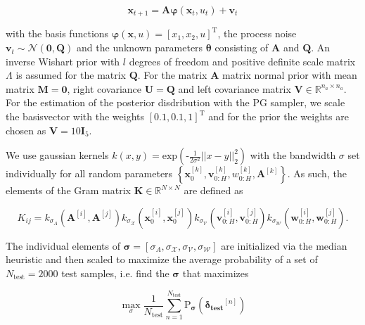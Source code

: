 \begin{equation} \label{State transition}
\boldsymbol{x}_{t+1} = \boldsymbol{A} \boldsymbol{\varphi}(\boldsymbol{x}_t, u_t) + \boldsymbol{v}_{t}
\end{equation}

with the basis functions $\boldsymbol{\varphi} (\boldsymbol{x}, u) = \left[ x_1,  x_2,  u \right]^\text{T}$, the process noise $\boldsymbol{v}_{t} \sim \mathcal{N} (\boldsymbol{0}, \boldsymbol{Q})$ and the unknown parameters $\boldsymbol{\theta}$ consisting of $\boldsymbol{A}$ and $\boldsymbol{Q}$. An inverse Wishart  prior with $l$ degrees of freedom and positive definite scale matrix $\Lambda$ is assumed for the matrix $\boldsymbol{Q}$. For the matrix $\boldsymbol{A}$ matrix normal prior with mean matrix $\boldsymbol{M} = \boldsymbol{0}$, right covariance $\boldsymbol{U} = \boldsymbol{Q}$ and left covariance matrix $\boldsymbol{V} \in \mathbb{R}^{n_a \times n_a}.$ For the estimation of the posterior disdribution with the PG sampler, we scale the basisvector with the weights $\left[ 0.1,  0.1,  1 \right]^\text{T}$ and for the prior the weights are chosen as $\boldsymbol{V} = 10 \boldsymbol{I}_5$.

We use gaussian kernels $k(x,y) = \text{exp}\left(\text{-}\frac{1}{2\sigma^2} ||x - y||_2^2 \right)$ with the bandwidth $\sigma$ set individually for all random parameters $\left\{\boldsymbol{x}_0^{[k]}, \boldsymbol{v}_{0:H}^{[k]}, w_{0:H}^{[k]},  \boldsymbol{A}^{[k]}\right\}$. As such, the elements of the Gram matrix $\boldsymbol{K} \in \mathbb{R}^{N \times N }$ are defined as

\begin{equation} \label{Kernel equation}
K_{ij} = k_{\sigma_A}(\boldsymbol{A}^{[i]}, \boldsymbol{A}^{[j]})  k_{\sigma_\mathcal{X}}(\boldsymbol{x}_0^{[i]}, \boldsymbol{x}_0^{[j]})    k_{\sigma_\mathcal{V}}(\boldsymbol{v}_{0:H}^{[i]}, \boldsymbol{v}_{0:H}^{[j]})  k_{\sigma_\mathcal{W}}(\boldsymbol{w}_{0:H}^{[i]}, \boldsymbol{w}_{0:H}^{[j]}).
\end{equation}

The individual elements of $\boldsymbol{\sigma} = [\sigma_A, \sigma_\mathcal{X}, \sigma_\mathcal{V}, \sigma_\mathcal{W}]$ are initialized via the median heuristic \cite{Damien_18} and then scaled to maximize the average probability of a set of $N_\text{test} = 2000$ test samples, i.e. find the $\boldsymbol{\sigma}$ that maximizes

 \begin{equation} \label{Average Probability}
\max\limits_{\sigma} \frac{1}{N_\text{test}}  \sum_{n= 1}^{N_\text{test}} \text{P}_{\boldsymbol{\sigma}} ( \boldsymbol{\delta_\text{test}}^{[n]} )
\end{equation}

